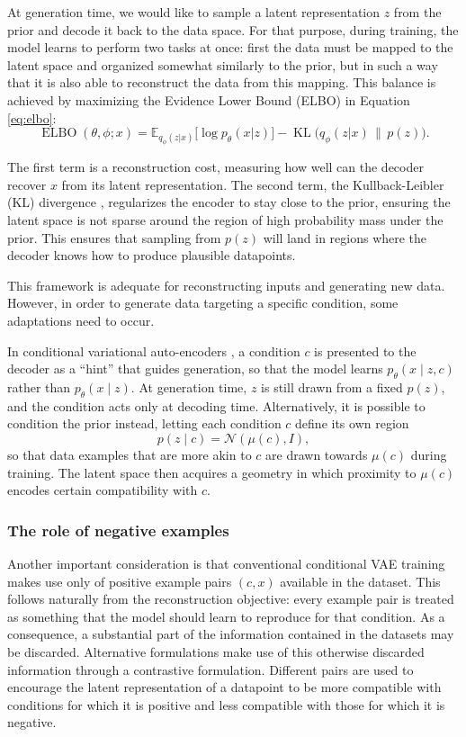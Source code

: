 \documentclass[a4paper,12pt]{article}
\newcommand{\E}{\mathbb{E}}
\newcommand{\Ncal}{\mathcal{N}}
\DeclareMathOperator{\KL}{KL}
\DeclareMathOperator{\ELBO}{ELBO}
\begin{document}
At generation time, we would like to sample a latent representation $z$ from the prior and decode it back to the data space. For that purpose, during training, the model learns to perform two tasks at once: first the data must be mapped to the latent space and organized somewhat similarly to the prior, but in such a way that it is also able to reconstruct the data from this mapping. This balance is achieved by maximizing the Evidence Lower Bound (ELBO) in Equation \ref{eq:elbo}:
\begin{equation}\label{eq:elbo}
    \ELBO(\theta, \phi; x) = \E_{q_\phi(z|x)}\!\bigl[\log p_\theta(x|z)\bigr] - \KL\!\bigl(q_\phi(z|x) \,\|\, p(z)\bigr).
\end{equation}

The first term is a reconstruction cost, measuring how well can the decoder recover $x$ from its latent representation. The second term, the Kullback-Leibler (KL) divergence \parencite{Kullback1951}, regularizes the encoder to stay close to the prior, ensuring the latent space is not sparse around the region of high probability mass under the prior. This ensures that sampling from $p(z)$ will land in regions where the decoder knows how to produce plausible datapoints.

This framework is adequate for reconstructing inputs and generating new data. However, in order to generate data targeting a specific condition, some adaptations need to occur.

In conditional variational auto-encoders \parencite{Sohn_Lee_Yan_2015}, a condition $c$ is presented to the decoder as a ``hint'' that guides generation, so that the model learns $p_\theta(x\mid z,c)$ rather than $p_\theta(x\mid z)$. At generation time, $z$ is still drawn from a fixed $p(z)$, and the condition acts only at decoding time. Alternatively, it is possible to condition the prior instead, letting each condition $c$ define its own region
\begin{equation*}\label{eq:cond_prior}
    p(z\mid c)=\Ncal\!\left(\mu(c),I\right),
\end{equation*}
so that data examples that are more akin to $c$ are drawn towards $\mu(c)$ during training. The latent space then acquires a geometry in which proximity to $\mu(c)$ encodes certain compatibility with $c$.

\subsubsection{The role of negative examples}
Another important consideration is that conventional conditional VAE training makes use only of positive example pairs $(c,x)$ available in the dataset. This follows naturally from the reconstruction objective: every example pair is treated as something that the model should learn to reproduce for that condition. As a consequence, a substantial part of the information contained in  the datasets may be discarded. Alternative formulations make use of this otherwise discarded information through a contrastive formulation. Different pairs are used to encourage the latent representation of a datapoint to be more compatible with conditions for which it is positive and less compatible with those for which it is negative.
\end{document}
